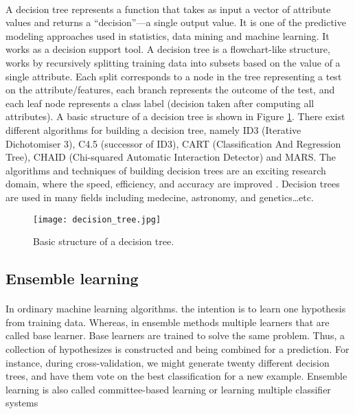 \paragraph{}
A decision tree represents a function that takes as input a vector of attribute values and returns a “decision”—a single output value\cite{ML:2}. It is one of the predictive modeling approaches used in statistics, data mining and machine learning. It works as a decision support tool. A decision tree is a flowchart-like structure, works by recursively splitting training data into subsets based on the value of a single attribute. Each split corresponds to a node in the tree representing a test on the attribute/features, each branch represents the outcome of the test, and each leaf node represents a class label (decision taken after computing all attributes). A basic structure of a decision tree is shown in Figure \ref{decision_tree}.\cite{MLDT:1,MLDT:2}
There exist different algorithms for building a decision tree, namely ID3 (Iterative Dichotomiser 3), C4.5 (successor of ID3), CART (Classification And Regression Tree), CHAID (Chi-squared Automatic Interaction Detector) and MARS. The algorithms and techniques of building decision trees are an exciting research domain, where the speed, efficiency, and accuracy are improved \cite{MLDT:2}.
Decision trees are used in many fields including medecine\cite{MLDTAP:3,MLDTAP:4}, astronomy\cite{MLDTAP:1}, and genetics\cite{MLDTAP:2}\dots etc.

\begin{figure}[ht]
 \texttt{[image: decision\_tree.jpg]}
 \centering         
 \caption{Basic structure of a decision tree.}
 \label{decision_tree}
\end{figure}

\subsection{Ensemble learning}
\paragraph{}
In ordinary machine learning algorithms. the intention is to learn one hypothesis from training data. Whereas, in ensemble methods\cite{MLEL:2} multiple learners that are called base learner. Base learners are trained to solve the same problem. Thus, a collection of hypothesizes is constructed and being combined for a prediction. For instance, during cross-validation, we might generate twenty different decision trees, and have them vote on the best classification for a new example. Ensemble learning is also called committee-based learning or learning multiple classifier systems\cite{ML:2}
